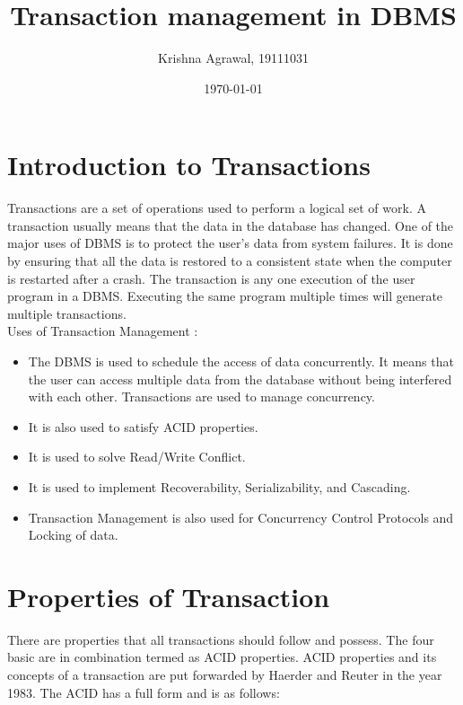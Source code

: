 \documentclass{article}
\title{Transaction management in DBMS}
\author{Krishna Agrawal, 19111031}
\date{\today}
\begin{document}
\maketitle


\section{Introduction to Transactions}

Transactions are a set of operations used to perform a logical set of work. A transaction usually means that the data in the database has changed. One of the major uses of DBMS is to protect the user’s data from system failures. It is done by ensuring that all the data is restored to a consistent state when the computer is restarted after a crash. The transaction is any one execution of the user program in a DBMS. Executing the same program multiple times will generate multiple transactions.\\

Uses of Transaction Management :
\begin{itemize}
\item The DBMS is used to schedule the access of data concurrently. It means that the user can access multiple data from the database without being interfered with each other. Transactions are used to manage concurrency.
\item It is also used to satisfy ACID properties.
\item It is used to solve Read/Write Conflict.
\item It is used to implement Recoverability, Serializability, and Cascading.
\item Transaction Management is also used for Concurrency Control Protocols and Locking of data.
\end{itemize}


\section{Properties of Transaction}

There are properties that all transactions should follow and possess. The four basic are in combination termed as ACID properties. ACID properties and its concepts of a transaction are put forwarded by Haerder and Reuter in the year 1983. The ACID has a full form and is as follows:
\end{document}
